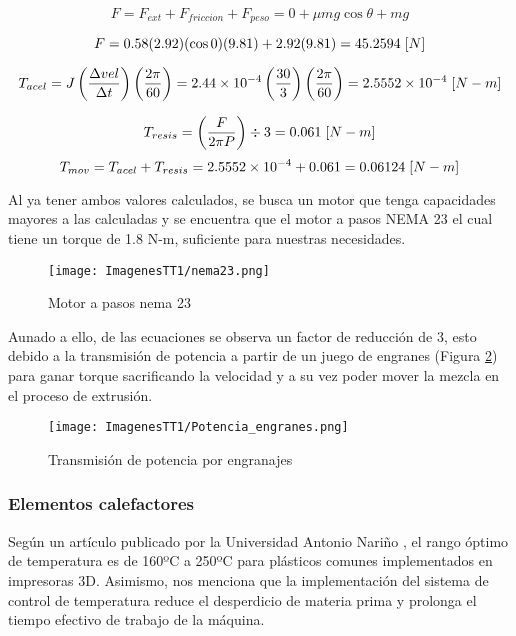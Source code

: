 \documentclass[14pt,oneside]{extarticle} %
\begin{document}
\begin{equation*}
    F=F_{ext}+F_{friccion}+F_{peso}=0+\mu mg\cos{\theta}+mg
\end{equation*}

\begin{equation*}
    F=0.58(2.92)(\cos{0})(9.81)+2.92(9.81)=45.2594\hspace{0.1cm}[N]
\end{equation*}

\begin{equation*}
    T_{acel}=J\left(\frac{\Delta vel}{\Delta t}\right)\left(\frac{2\pi}{60}\right)=2.44\times10^{-4}\left(\frac{30}{3}\right)\left(\frac{2\pi}{60}\right)=2.5552\times10^{-4}\hspace{0.1cm}[N-m]
\end{equation*}

\begin{equation*}
    T_{resis}=\left(\frac{F}{2\pi P}\right)\div 3=0.061\hspace{0.1cm}[N-m]
\end{equation*}
\begin{equation*}
    T_{mov}=T_{acel}+T_{resis}=2.5552\times 10^{-4}+0.061=0.06124\hspace{0.1cm}[N-m]
\end{equation*}

Al ya tener ambos valores calculados, se busca un motor que tenga capacidades mayores a las calculadas y se encuentra que el motor a pasos NEMA 23 el cual tiene un torque de 1.8 N-m, suficiente para nuestras necesidades.

\begin{figure}[h]
    \centering
    \texttt{[image: ImagenesTT1/nema23.png]}
    \caption{Motor a pasos nema 23}
    \label{fig:nema23}
\end{figure}

Aunado a ello, de las ecuaciones se observa un factor de reducción de 3, esto debido a la transmisión de potencia a partir de un juego de engranes (Figura \ref{fig:Potencia_engranes}) para ganar torque sacrificando la velocidad y a su vez poder mover la mezcla en el proceso de extrusión.

\begin{figure}[H]
    \centering
    \texttt{[image: ImagenesTT1/Potencia\_engranes.png]}
    \caption{Transmisión de potencia por engranajes}
    \label{fig:Potencia_engranes}
\end{figure}

\subsubsection{Elementos calefactores}
Según un artículo publicado por la Universidad Antonio Nariño \cite{moreno2011}, el rango óptimo de temperatura es de 160ºC a 250ºC para plásticos comunes implementados en impresoras 3D. Asimismo, nos menciona que la implementación del sistema de control de temperatura reduce el desperdicio de materia prima y prolonga el tiempo efectivo de trabajo de la máquina.
\end{document}
